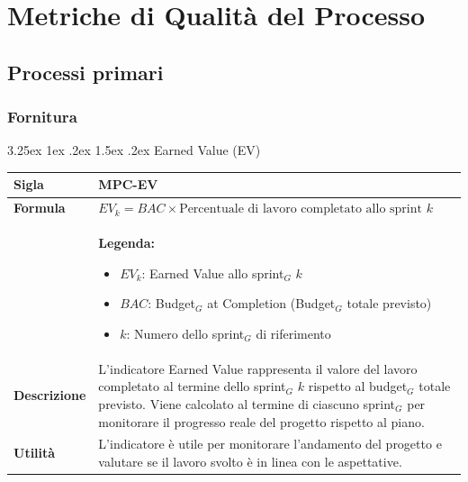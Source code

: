 \documentclass[a4paper, 10pt]{article}
\makeatletter
\renewcommand\paragraph{\@startsection{paragraph}{4}{\z@}%
  {3.25ex \@plus1ex \@minus .2ex}%
  {1.5ex \@plus .2ex}%
  {\normalfont\normalsize\bfseries}}
\makeatother
\begin{document}
\section{Metriche di Qualità del Processo}
\subsection{Processi primari}
\subsubsection{Fornitura}

\paragraph{Earned Value (EV)}
\mbox{} \\
\noindent
\begin{minipage}{\textwidth}
    \begin{tabularx}{\textwidth}{|>{\columncolor{bluBitless!10}\bfseries}p{3.5cm}|X|}
        \hline
        Sigla & MPC-EV \\ \hline
        Formula &  
        \textit{$EV_{k} = BAC \times \text{Percentuale di lavoro completato allo sprint } k$} \vspace{2mm} \\
        & \small \textbf{Legenda:}
        \begin{itemize}
            \item $EV_{k}$: Earned Value allo sprint$_G$ $k$
            \item $BAC$: Budget$_G$ at Completion (Budget$_G$ totale previsto)
            \item $k$: Numero dello sprint$_G$ di riferimento
        \end{itemize} \\ \hline
        Descrizione & L'indicatore Earned Value rappresenta il valore del lavoro completato al termine dello sprint$_G$ $k$ rispetto al budget$_G$ totale previsto. Viene calcolato al termine di ciascuno sprint$_G$ per monitorare il progresso reale del progetto rispetto al piano. \\ \hline
        Utilità & L'indicatore è utile per monitorare l'andamento del progetto e valutare se il lavoro svolto è in linea con le aspettative. \\ \hline
    \end{tabularx}
\end{minipage}
\end{document}
